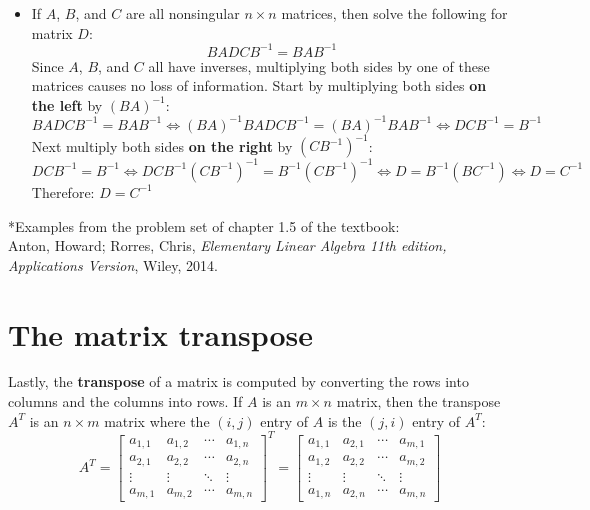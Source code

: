 \documentclass{article}
\begin{document}
\begin{itemize}
\begin{align*}
\begin{array}{cccc|cccc}
0 & 1 & 0 & 0 & 3/2 &      0 &    -1 &     0 \\
0 & 0 & 1 & 0  & 1/2 &     0 &     0 &    0 \\
0 & 0 & 0 & 1  & 4/5 & 2/5 & -1/5 & -1/5
\end{array}\right] \\ 
\end{align*}
Therefore \(A\) is nonsingular and has the inverse matrix: 
\[A^{-1} = \begin{bmatrix}
-4/5 & 3/5 & 1/5 &  1/5 \\
3/2 &      0 &    -1 &     0 \\
1/2 &     0 &     0 &    0 \\
4/5 & 2/5 & -1/5 & -1/5
\end{bmatrix}\]
\item If \(A\), \(B\), and \(C\) are all nonsingular \(n \times n\) matrices, then solve the following for matrix \(D\):
\[BADCB^{-1} = BAB^{-1}\]
Since \(A\), \(B\), and \(C\) all have inverses, multiplying both sides by one of these matrices causes no loss of information. Start by multiplying both sides {\bf on the left} by \((BA)^{-1}\):
\[BADCB^{-1} = BAB^{-1} \iff (BA)^{-1}BADCB^{-1} = (BA)^{-1}BAB^{-1} \iff DCB^{-1} = B^{-1}\]
Next multiply both sides {\bf on the right} by \((CB^{-1})^{-1}\):   
\[DCB^{-1} = B^{-1} \iff DCB^{-1}(CB^{-1})^{-1} = B^{-1}(CB^{-1})^{-1} \iff D = B^{-1}(BC^{-1}) \iff D = C^{-1}\]
Therefore: \(D = C^{-1}\)
\end{itemize}

*Examples from the problem set of chapter 1.5 of the textbook: \\
Anton, Howard; Rorres, Chris, \emph{Elementary Linear Algebra 11th edition, Applications Version}, Wiley, 2014.




\section*{The matrix transpose}

Lastly, the {\bf transpose} of a matrix is computed by converting the rows into columns and the columns into rows. If \(A\) is an \(m \times n\) matrix, then the transpose \(A^T\) is an \(n \times m\) matrix where the \((i,j)\) entry of \(A\) is the \((j,i)\) entry of \(A^T\):
\[A^T = \begin{bmatrix} a_{1,1} & a_{1,2} & \cdots & a_{1,n} \\ a_{2,1} & a_{2,2} & \cdots & a_{2,n} \\ \vdots & \vdots & \ddots & \vdots \\ a_{m,1} & a_{m,2} & \cdots & a_{m,n} \end{bmatrix}^T
= \begin{bmatrix} a_{1,1} & a_{2,1} & \cdots & a_{m,1} \\ a_{1,2} & a_{2,2} & \cdots & a_{m,2} \\ \vdots & \vdots & \ddots & \vdots \\ a_{1,n} & a_{2,n} & \cdots & a_{m,n} \end{bmatrix}\]
\end{document}
